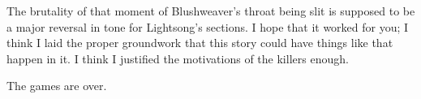 The brutality of that moment of Blushweaver’s throat being slit is supposed to be a major reversal in tone for Lightsong’s sections. I hope that it worked for you; I think I laid the proper groundwork that this story could have things like that happen in it. I think I justified the motivations of the killers enough.

The games are over.



